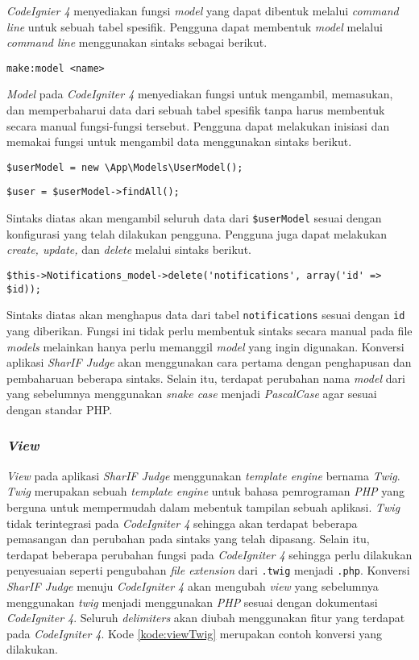 \begin{enumerate}
\textit{CodeIgnier 4} menyediakan fungsi \textit{model} yang dapat dibentuk melalui \textit{command line} untuk sebuah tabel spesifik. Pengguna dapat membentuk \textit{model} melalui \textit{command line} menggunakan sintaks sebagai berikut.
\begin{center}
	\verb|make:model <name>|
\end{center}
\textit{Model} pada \textit{CodeIgniter 4} menyediakan fungsi untuk mengambil, memasukan, dan memperbaharui data dari sebuah tabel spesifik tanpa harus membentuk secara manual fungsi-fungsi tersebut. Pengguna dapat melakukan inisiasi dan memakai fungsi untuk mengambil data menggunakan sintaks berikut.
\begin{center}
	\verb|$userModel = new \App\Models\UserModel();|
\end{center}
\begin{center}
	\verb|$user = $userModel->findAll();|
\end{center}
\end{enumerate}

Sintaks diatas akan mengambil seluruh data dari \verb|$userModel| sesuai dengan konfigurasi yang telah dilakukan pengguna. Pengguna juga dapat melakukan \textit{create, update,} dan \textit{delete} melalui sintaks berikut.

\begin{center}
	\verb|$this->Notifications_model->delete('notifications', array('id' => $id));|
\end{center}
Sintaks diatas akan menghapus data dari tabel \texttt{notifications} sesuai dengan \texttt{id} yang diberikan. Fungsi ini tidak perlu membentuk sintaks secara manual pada file \textit{models} melainkan hanya perlu memanggil \textit{model} yang ingin digunakan. Konversi aplikasi \textit{SharIF Judge} akan menggunakan cara pertama dengan penghapusan dan pembaharuan beberapa sintaks. Selain itu, terdapat perubahan nama \textit{model} dari yang sebelumnya menggunakan \textit{snake case} menjadi \textit{PascalCase} agar sesuai dengan standar PHP.

\subsubsection{\textit{View}}
\textit{View} pada aplikasi \textit{SharIF Judge} menggunakan \textit{template engine} bernama \textit{Twig}. \textit{Twig} merupakan sebuah \textit{template engine} untuk bahasa pemrograman \textit{PHP} yang berguna untuk mempermudah dalam mebentuk tampilan sebuah aplikasi. \textit{Twig} tidak terintegrasi pada \textit{CodeIgniter 4} sehingga akan terdapat beberapa pemasangan dan perubahan pada sintaks yang telah dipasang. Selain itu, terdapat beberapa perubahan fungsi pada \textit{CodeIgniter 4} sehingga perlu dilakukan penyesuaian seperti pengubahan \textit{file extension} dari \texttt{.twig} menjadi \texttt{.php}. Konversi \textit{SharIF Judge} menuju \textit{CodeIgniter 4} akan mengubah \textit{view} yang sebelumnya menggunakan \textit{twig} menjadi menggunakan \textit{PHP} sesuai dengan dokumentasi \textit{CodeIgniter 4}. Seluruh \textit{delimiters} akan diubah menggunakan fitur yang terdapat pada \textit{CodeIgniter 4}. Kode \ref{kode:viewTwig} merupakan contoh konversi yang dilakukan.

